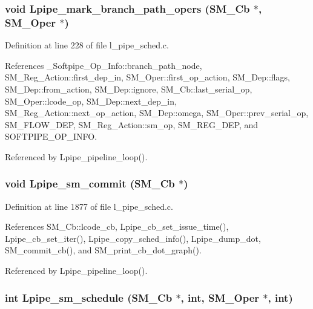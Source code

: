 \subsubsection{\setlength{\rightskip}{0pt plus 5cm}void Lpipe\_\-mark\_\-branch\_\-path\_\-opers (\bf{SM\_\-Cb} $\ast$, \bf{SM\_\-Oper} $\ast$)}\label{l__pipe__sched_8h_17a1a52d06eb95a93472c75b7d316989}




Definition at line 228 of file l\_\-pipe\_\-sched.c.

References \_\-Softpipe\_\-Op\_\-Info::branch\_\-path\_\-node, SM\_\-Reg\_\-Action::first\_\-dep\_\-in, SM\_\-Oper::first\_\-op\_\-action, SM\_\-Dep::flags, SM\_\-Dep::from\_\-action, SM\_\-Dep::ignore, SM\_\-Cb::last\_\-serial\_\-op, SM\_\-Oper::lcode\_\-op, SM\_\-Dep::next\_\-dep\_\-in, SM\_\-Reg\_\-Action::next\_\-op\_\-action, SM\_\-Dep::omega, SM\_\-Oper::prev\_\-serial\_\-op, SM\_\-FLOW\_\-DEP, SM\_\-Reg\_\-Action::sm\_\-op, SM\_\-REG\_\-DEP, and SOFTPIPE\_\-OP\_\-INFO.

Referenced by Lpipe\_\-pipeline\_\-loop().
\subsubsection{\setlength{\rightskip}{0pt plus 5cm}void Lpipe\_\-sm\_\-commit (\bf{SM\_\-Cb} $\ast$)}\label{l__pipe__sched_8h_dd7366875dda49d931f80947bf3a2dda}




Definition at line 1877 of file l\_\-pipe\_\-sched.c.

References SM\_\-Cb::lcode\_\-cb, Lpipe\_\-cb\_\-set\_\-issue\_\-time(), Lpipe\_\-cb\_\-set\_\-iter(), Lpipe\_\-copy\_\-sched\_\-info(), Lpipe\_\-dump\_\-dot, SM\_\-commit\_\-cb(), and SM\_\-print\_\-cb\_\-dot\_\-graph().

Referenced by Lpipe\_\-pipeline\_\-loop().
\subsubsection{\setlength{\rightskip}{0pt plus 5cm}int Lpipe\_\-sm\_\-schedule (\bf{SM\_\-Cb} $\ast$, int, \bf{SM\_\-Oper} $\ast$, int)}\label{l__pipe__sched_8h_4a201d1e1f411d624841e0c211d4607f}




